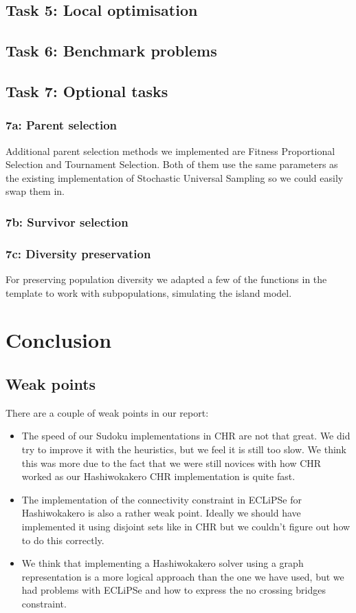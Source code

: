 \documentclass{report}
\newcommand{\mychapter}[2]{
    \setcounter{chapter}{#1}
    \setcounter{section}{0}
    \chapter*{#2}
    \addcontentsline{toc}{chapter}{#2}
}
\begin{document}
\section{Task 5: Local optimisation}
\newpage

\section{Task 6: Benchmark problems}
\newpage

\section{Task 7: Optional tasks}
\subsection{7a: Parent selection}
Additional parent selection methods we implemented are Fitness Proportional Selection and Tournament Selection. Both of them use the same parameters as the existing implementation of Stochastic Universal Sampling so we could easily swap them in.

\subsection{7b: Survivor selection}
\subsection{7c: Diversity preservation}
For preserving population diversity we adapted a few of the functions in the template to work with subpopulations, simulating the island model.

\newpage

\mychapter{2}{Conclusion}

\section{Weak points}
There are a couple of weak points in our report:
\begin{itemize}
    \item The speed of our Sudoku implementations in CHR are not that great. We did try to improve it with the heuristics, but we feel it is still too slow. We think this was more due to the fact that we were still novices with how CHR worked as our Hashiwokakero CHR implementation is quite fast.
    \item The implementation of the connectivity constraint in ECLiPSe for Hashiwokakero is also a rather weak point. Ideally we should have implemented it using disjoint sets like in CHR but we couldn't figure out how to do this correctly.
    \item We think that implementing a Hashiwokakero solver using a graph representation is a more logical approach than the one we have used, but we had problems with ECLiPSe and how to express the no crossing bridges constraint.
\end{itemize}
\end{document}
